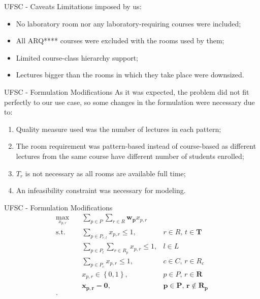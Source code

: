 \documentclass{beamer}
\begin{document}
\begin{frame}{UFSC - Caveats}
    Limitations imposed by us:
    \begin{itemize}
        \item No laboratory room nor any laboratory-requiring courses were included;
	\item All ARQ**** courses were excluded with the rooms used by them;
	\item Limited course-class hierarchy support;
	\item Lectures bigger than the rooms in which they take place were downsized.
    \end{itemize}
\end{frame}

\begin{frame}{UFSC - Formulation Modifications}
    As it was expected, the problem did not fit perfectly to our use case, so some changes in the formulation were necessary due to:
    \begin{enumerate}
	\item Quality measure used was the number of lectures in each pattern;
	\item The room requirement was pattern-based instead of course-based as different lectures from the same course have different number of students enrolled;
        \item $T_r$ is not necessary as all rooms are available full time;
	\item An infeasibility constraint was necessary for modeling.
    \end{enumerate}


\end{frame}
\begin{frame}{UFSC - Formulation Modifications}
    \begin{align*}
	\max_{x_{p,r}} \quad & \sum_{p \in P} \sum_{r\in R} \boldsymbol{w_{p}}x_{p,r} \\
	\textrm{s.t.} \quad & \sum_{p \in P_{r,t}} x_{p,r} \le 1, & r\in R,\,t\in \boldsymbol{T} \\
			    & \sum_{p \in P_l} \sum_{r \in R_p} x_{p,r} \le 1, & l \in L \\
			    & \sum_{p \in P_c} x_{p,r} \le 1, & c \in C,\, r \in R_c \\
			    & x_{p,r} \in \left\{ 0,1 \right\}, & p \in P,\, r\in \boldsymbol{R} \\
			    & \boldsymbol{x_{p,r}=0,} & \boldsymbol{p \in P,\, r \notin R_p} \\
    .\end{align*}
    
\end{frame}
\end{document}
